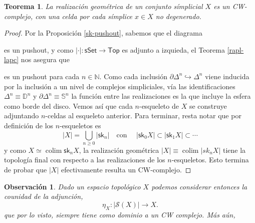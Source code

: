 \documentclass[11pt]{report}
\theoremstyle{colored}
\newtheorem{theorem}{Teorema}[section]
\newtheorem{remark}{Observación}[section]
\newcommand{\N}{\mathbb{N}}
\newcommand{\D}{\mathbb{D}}
\newcommand{\Ss}{\mathbb{S}}
\newcommand{\cat}[1]{\mathsf{#1}}
\newcommand{\sk}{\mathsf{sk}}
\renewcommand{\ss}[1]{\Delta^{#1}}
\begin{document}
\begin{theorem} La realización geométrica de un conjunto símplicial $X$ es un CW-complejo, con una celda por cada símplice $x \in X$ no degenerado.
\end{theorem}
\begin{proof} Por la Proposición \ref{sk-pushout}, sabemos que el diagrama
\begin{center}
\end{center}
es un pushout, y como $| \cdot | : \cat{sSet} \to \cat{Top}$ es adjunto a izquieda, el Teorema \ref{rapl-lapc} nos asegura que
\begin{center}
\end{center}
es un pushout para cada $n \in \N$. Como cada inclusión $\partial \ss{n} \hookrightarrow \ss{n}$ viene inducida por la inclusión a un nivel de complejos simpliciales, vía las identificaciones $\ss{n} \equiv \D^n$ y $\partial \ss{n} \equiv \Ss^n$ la función entre las realizaciones es la que incluye la esfera como borde del disco. Vemos así que cada $n$-esqueleto de $X$ se construye adjuntando $n$-celdas al esqueleto anterior. Para terminar, resta notar que por definición de los $n$-esqueletos es
\[
|X| = \bigcup_{n \geq 0} |\sk_n| \quad \text{con } \quad |\sk_0 X| \subset |\sk_1 X| \subset  \cdots
\] 
y como $X \simeq \operatorname{colim} \sk_nX$, la realización geométrica $|X|\equiv \operatorname{colim} |sk_n X|$ tiene la topología final con respecto a las realizaciones de los $n$-esqueletos. Esto termina de probar que $|X|$ efectivamente resulta un CW-complejo.
\end{proof}

\begin{remark} Dado un espacio topológico $X$ podemos considerar entonces la counidad de la adjunción, 
\[
\eta_X : |\mathcal{S}(X)|\to X.
\]
que por lo visto, siempre tiene como dominio a un CW complejo. Más aún, 
\end{remark}
\end{document}
